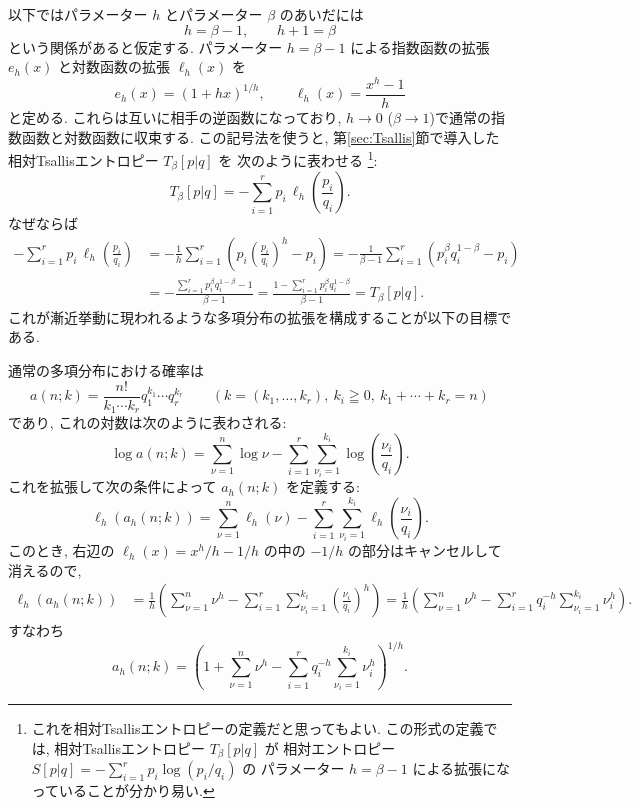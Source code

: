 \documentclass[12pt,twoside]{jarticle}
\theoremstyle{definition} %
\theoremstyle{definition} %
\theoremstyle{definition} %
\numberwithin{theorem}{section}
\numberwithin{equation}{section}
\numberwithin{figure}{section}
\numberwithin{table}{section}
\newcommand\secref[1]{第\ref{#1}節}
\begin{document}
以下ではパラメーター $h$ とパラメーター $\beta$ のあいだには
\[
h=\beta-1, \qquad h+1=\beta
\]
という関係があると仮定する.
パラメーター $h=\beta-1$ による指数函数の拡張 $e_h(x)$ と対数函数の拡張 $\ell_h(x)$ を
\[
e_h(x) = (1+hx)^{1/h}, \qquad
\ell_h(x) = \frac{x^h-1}{h}
\]
と定める. これらは互いに相手の逆函数になっており, 
$h\to 0$ ($\beta\to 1$)で通常の指数函数と対数函数に収束する.
この記号法を使うと, 
\secref{sec:Tsallis}で導入した相対Tsallisエントロピー $T_\beta[p|q]$ を
次のように表わせる%
\footnote{これを相対Tsallisエントロピーの定義だと思ってもよい.
この形式の定義では, 相対Tsallisエントロピー $T_\beta[p|q]$ が
相対エントロピー $S[p|q]=-\sum_{i=1}^r p_i\log(p_i/q_i)$ の
パラメーター $h=\beta-1$ による拡張になっていることが分かり易い.}:
\[
T_\beta[p|q] = -\sum_{i=1}^r p_i\,\ell_h\left(\frac{p_i}{q_i}\right).
\]
なぜならば
\begin{align*}
-\sum_{i=1}^r p_i\,\ell_h\left(\frac{p_i}{q_i}\right)
&
=-\frac{1}{h}\sum_{i=1}^r \left(p_i\left(\frac{p_i}{q_i}\right)^h-p_i\right)
=-\frac{1}{\beta-1}\sum_{i=1}^r(p_i^\beta q_i^{1-\beta}-p_i)
\\ &
=-\frac{\sum_{i=1}^r p_i^\beta q_i^{1-\beta}-1}{\beta-1}
=\frac{1-\sum_{i=1}^r p_i^\beta q_i^{1-\beta}}{\beta-1}
=T_\beta[p|q].
\end{align*}
これが漸近挙動に現われるような多項分布の拡張を構成することが以下の目標である.

通常の多項分布における確率は
\[
a(n;k)=\frac{n!}{k_1\cdots k_r}q_1^{k_1}\cdots q_r^{k_r}
\qquad \left(k=(k_1,\ldots,k_r),\ k_i\geqq 0,\ k_1+\cdots+k_r=n\right)
\]
であり, これの対数は次のように表わされる:
\[
\log a(n;k)
= \sum_{\nu=1}^n\log\nu 
- \sum_{i=1}^r\sum_{\nu_i=1}^{k_i} \log\left(\frac{\nu_i}{q_i}\right).
\]
これを拡張して次の条件によって $a_h(n;k)$ を定義する:
\[
\ell_h(a_h(n;k))
=
\sum_{\nu=1}^n\ell_h(\nu) 
- \sum_{i=1}^r\sum_{\nu_i=1}^{k_i} \ell_h\left(\frac{\nu_i}{q_i}\right).
\]
このとき, 右辺の $\ell_h(x)=x^h/h-1/h$ の中の $-1/h$ の部分はキャンセルして消えるので, 
\begin{align*}
\ell_h(a_h(n;k))
&
=\frac{1}{h}\left(
  \sum_{\nu=1}^n \nu^h 
 -\sum_{i=1}^r \sum_{\nu_i=1}^{k_i} \left(\frac{\nu_i}{q_i}\right)^h
\right)
=\frac{1}{h}\left(
  \sum_{\nu=1}^n \nu^h
 -\sum_{i=1}^r q_i^{-h} \sum_{\nu_i=1}^{k_i}\nu_i^h
\right).
\end{align*}
すなわち
\[
a_h(n;k)
=\left(
  1
 +\sum_{\nu=1}^n \nu^h
 -\sum_{i=1}^r q_i^{-h} \sum_{\nu_i=1}^{k_i}\nu_i^h
\right)^{1/h}.
\]
\end{document}
